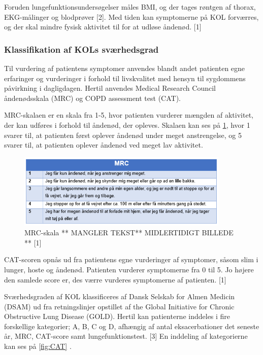\noindent
Foruden lungefunktionsundersøgelser måles BMI, og der tages røntgen af thorax, EKG-målinger og blodprøver [2].
Med tiden kan symptomerne på KOL forværres, og der skal mindre fysisk aktivitet til for at udløse åndenød. [1]

\subsubsection{Klassifikation af KOLs sværhedsgrad}
Til vurdering af patientens symptomer anvendes blandt andet patienten egne erfaringer og vurderinger i forhold til livskvalitet med hensyn til sygdommens påvirkning i dagligdagen. Hertil anvendes Medical Research Council åndenødsskala (MRC) og COPD assessment test (CAT).
 
MRC-skalaen er en skala fra 1-5, hvor patienten vurderer mængden af aktivitet, der kan udføres i forhold til åndenød, der opleves. Skalaen kan ses på \ref{fig:MRC}, hvor 1 svarer til, at patienten først oplever åndenød under meget anstrengelse, og 5 svarer til, at patienten oplever åndenød ved meget lav aktivitet.

\begin{figure} [H]
\centering
\includegraphics[width=0.9\textwidth]{figures/MRC}
\caption{MRC-skala ** MANGLER TEKST** MIDLERTIDIGT BILLEDE ** [1]}
\label{fig:MRC}
\end{figure} 

\noindent
CAT-scoren opnås ud fra patientens egne vurderinger af symptomer, såsom slim i lunger, hoste og åndenød. Patienten vurderer symptomerne fra 0 til 5. Jo højere den samlede score er, des værre vurderes symptomerne af patienten. [1]
 
Sværhedsgraden af KOL klassificeres af Dansk Selskab for Almen Medicin (DSAM) ud fra retningslinjer opstillet af the Global Initiative for Chronic Obstructive Lung Disease (GOLD). Hertil kan patienterne inddeles i fire forskellige kategorier; A, B, C og D, afhængig af antal eksacerbationer det seneste år, MRC, CAT-score samt lungefunktionstest. [3] En inddeling af kategorierne kan ses på \ref{fig:CAT} .

